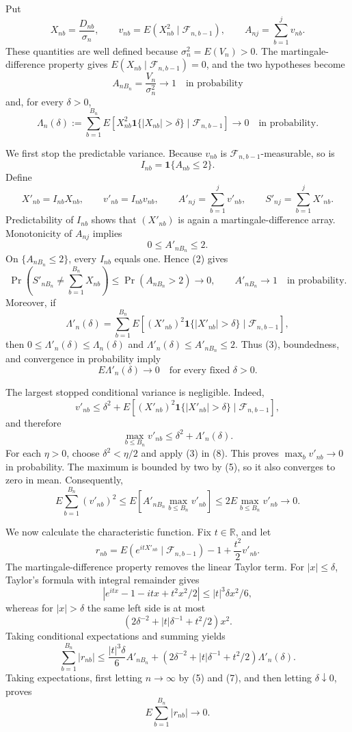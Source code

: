 Put
\[
X_{nb}=\frac{D_{nb}}{\sigma_n},\qquad
v_{nb}=E(X_{nb}^2\mid\mathcal F_{n,b-1}),\qquad
A_{nj}=\sum_{b=1}^{j}v_{nb}.
\tag{1}
\]
These quantities are well defined because \(\sigma_n^2=E(V_n)>0\).  The
martingale-difference property gives
\(E(X_{nb}\mid\mathcal F_{n,b-1})=0\), and the two hypotheses become
\[
A_{nB_n}=\frac{V_n}{\sigma_n^2}\longrightarrow1
\quad\text{in probability}
\tag{2}
\]
and, for every \(\delta>0\),
\[
\Lambda_n(\delta):=\sum_{b=1}^{B_n}
E\!\left[X_{nb}^2\mathbf 1\{|X_{nb}|>\delta\}
\mid\mathcal F_{n,b-1}\right]
\longrightarrow0
\quad\text{in probability}.
\tag{3}
\]

We first stop the predictable variance.  Because \(v_{nb}\) is
\(\mathcal F_{n,b-1}\)-measurable, so is
\[
I_{nb}=\mathbf 1\{A_{nb}\le2\}.
\]
Define
\[
X'_{nb}=I_{nb}X_{nb},\qquad v'_{nb}=I_{nb}v_{nb},\qquad
A'_{nj}=\sum_{b=1}^{j}v'_{nb},\qquad
S'_{nj}=\sum_{b=1}^{j}X'_{nb}.
\tag{4}
\]
Predictability of \(I_{nb}\) shows that \((X'_{nb})\) is again a
martingale-difference array.  Monotonicity of \(A_{nj}\) implies
\[
0\le A'_{nB_n}\le2.
\tag{5}
\]
On \(\{A_{nB_n}\le2\}\), every \(I_{nb}\) equals one.  Hence (2) gives
\[
\Pr\!\left(S'_{nB_n}\ne\sum_{b=1}^{B_n}X_{nb}\right)
\le\Pr(A_{nB_n}>2)\longrightarrow0,
\qquad A'_{nB_n}\longrightarrow1
\quad\text{in probability}.
\tag{6}
\]
Moreover, if
\[
\Lambda'_n(\delta)=\sum_{b=1}^{B_n}
E\!\left[(X'_{nb})^2\mathbf 1\{|X'_{nb}|>\delta\}
\mid\mathcal F_{n,b-1}\right],
\]
then \(0\le\Lambda'_n(\delta)\le\Lambda_n(\delta)\) and
\(\Lambda'_n(\delta)\le A'_{nB_n}\le2\).  Thus (3), boundedness, and
convergence in probability imply
\[
E\Lambda'_n(\delta)\longrightarrow0
\quad\text{for every fixed }\delta>0.
\tag{7}
\]

The largest stopped conditional variance is negligible.  Indeed,
\[
v'_{nb}\le\delta^2+
E\!\left[(X'_{nb})^2\mathbf 1\{|X'_{nb}|>\delta\}
\mid\mathcal F_{n,b-1}\right],
\]
and therefore
\[
\max_{b\le B_n}v'_{nb}\le\delta^2+\Lambda'_n(\delta).
\tag{8}
\]
For each \(\eta>0\), choose \(\delta^2<\eta/2\) and apply (3) in (8).
This proves \(\max_bv'_{nb}\to0\) in probability.  The maximum is bounded
by two by (5), so it also converges to zero in mean.  Consequently,
\[
E\sum_{b=1}^{B_n}(v'_{nb})^2
\le E\!\left[A'_{nB_n}\max_{b\le B_n}v'_{nb}\right]
\le2E\max_{b\le B_n}v'_{nb}\longrightarrow0.
\tag{9}
\]

We now calculate the characteristic function.  Fix \(t\in\mathbb R\), and
let
\[
r_{nb}=E(e^{itX'_{nb}}\mid\mathcal F_{n,b-1})-1
+\frac{t^2}{2}v'_{nb}.
\tag{10}
\]
The martingale-difference property removes the linear Taylor term.  For
\(|x|\le\delta\), Taylor's formula with integral remainder gives
\[
|e^{itx}-1-itx+t^2x^2/2|\le |t|^3\delta x^2/6,
\]
whereas for \(|x|>\delta\) the same left side is at most
\[
\left(2\delta^{-2}+|t|\delta^{-1}+t^2/2\right)x^2.
\]
Taking conditional expectations and summing yields
\[
\sum_{b=1}^{B_n}|r_{nb}|
\le \frac{|t|^3\delta}{6}A'_{nB_n}
+\left(2\delta^{-2}+|t|\delta^{-1}+t^2/2\right)
\Lambda'_n(\delta).
\tag{11}
\]
Taking expectations, first letting \(n\to\infty\) by (5) and (7), and then
letting \(\delta\downarrow0\), proves
\[
E\sum_{b=1}^{B_n}|r_{nb}|\longrightarrow0.
\tag{12}
\]

